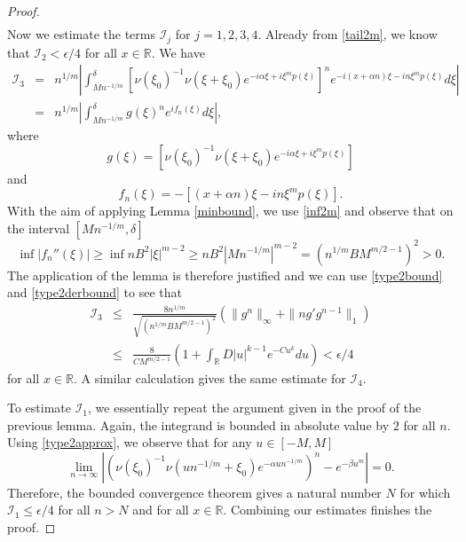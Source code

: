 \documentclass{article}
\theoremstyle{theorem}
\theoremstyle{remark}
\begin{document}
\begin{proof}
\begin{eqnarray*}
\end{eqnarray*}
Now we estimate the terms $\mathcal{I}_j$ for $j=1,2,3,4.$ Already from \eqref{tail2m}, we know that $\mathcal{I}_2<\epsilon/4$ for all $x\in\mathbb{R}$. We have
\begin{eqnarray*}
\mathcal{I}_3&=&n^{1/m}\left|\int_{Mn^{-1/m}}^{\delta}[\nu(\xi_0)^{-1}\nu(\xi+\xi_0)e^{-i\alpha\xi+i\xi^m p(\xi)}]^n
e^{-i(x+\alpha n)\xi-in\xi^m p(\xi)}d\xi\right|\\
&=&n^{1/m}\left|\int_{Mn^{-1/m}}^{\delta}g(\xi)^ne^{if_n(\xi)}d\xi\right|,
\end{eqnarray*}
where
\begin{equation*}
 g(\xi)=[\nu(\xi_0)^{-1}\nu(\xi+\xi_0)e^{-i\alpha\xi+i\xi^m p(\xi)}]
\end{equation*}
and 
\begin{equation*}
f_n(\xi)=-[(x+\alpha n)\xi-in\xi^m p(\xi)].
\end{equation*}
With the aim of applying Lemma \ref{minbound}, we use \eqref{inf2m} and observe that on the interval $[Mn^{-1/m},\delta]$
\begin{equation*}
\inf|f_n''(\xi)|\geq\inf nB^2|\xi|^{m-2}\geq nB^2 |Mn^{-1/m}|^{m-2}=(n^{1/m}B M^{m/2-1})^2>0.
\end{equation*}
The application of the lemma is therefore justified and we can use \eqref{type2bound} and \eqref{type2derbound} to see that
\begin{eqnarray*}
\mathcal{I}_3&\leq& \frac{8n^{1/m}}{\sqrt{(n^{1/m}B M^{m/2-1})^2}}(\|g^n\|_{\infty}+\|ng'g^{n-1}\|_1)\\
&\leq& \frac{8}{CM^{m/2-1}}\left(1+\int_{\mathbb{R}}D|u|^{k-1}e^{-Cu^k}du\right)<\epsilon/4
\end{eqnarray*}
for all $x\in \mathbb{R}$. A similar calculation gives the same estimate for $\mathcal{I}_4$. 

To estimate $\mathcal{I}_1$, we essentially repeat the argument given in the proof of the previous lemma. Again, the integrand is bounded in absolute value by $2$ for all $n$. Using \eqref{type2approx}, we observe that for any $u\in[-M,M]$
\begin{equation*}
 \lim_{n\rightarrow \infty} \left|\left(\nu(\xi_0)^{-1}\nu(un^{-1/m}+\xi_0)e^{-\alpha un^{-1/m}}\right)^n-e^{-\beta u^m}\right|=0.
\end{equation*}
Therefore, the bounded convergence theorem gives a natural number $N$ for which $\mathcal{I}_1\leq \epsilon/4$ for all $n>N$ and for all $x\in \mathbb{R}$. Combining our estimates finishes the proof.
\end{proof}
\end{document}
